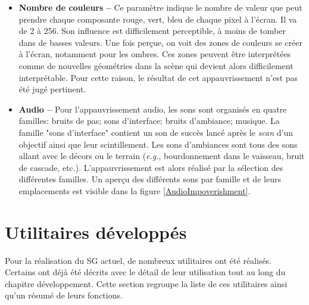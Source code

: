\begin{itemize}
			\item \textbf{Nombre de couleurs --} Ce paramètre indique le nombre de valeur que peut prendre chaque composante rouge, vert, bleu de chaque pixel à l'écran. Il va de 2 à 256. Son influence est difficilement perceptible, à moins de tomber dans de basses valeurs. Une fois perçue, on voit des zones de couleurs se créer à l'écran, notamment pour les ombres. Ces zones peuvent être interprétées comme de nouvelles géométries dans la scène qui devient alors difficilement interprétable. Pour cette raison, le résultat de cet appauvrissement n'est pas été jugé pertinent.
			
			\item \textbf{Audio --} Pour l'appauvrissement audio, les sons sont organisés en quatre familles: bruits de pas; sons d'interface; bruits d'ambiance; musique. La famille "sons d'interface" contient un son de succès lancé après le \textit{scan} d'un objectif ainsi que leur scintillement. Les sons d'ambiances sont tous des sons allant avec le décors ou le terrain (\textit{e.g.}, bourdonnement dans le vaisseau, bruit de cascade, etc.). L'appauvrissement est alors réalisé par la sélection des différentes familles. Un aperçu des différents sons par famille et de leurs emplacements est visible dans la figure \ref{AudioImpoverishment}.
		\end{itemize}
	
\section{Utilitaires développés}
	\label{sResUtilitaires}
	Pour la réalisation du SG actuel, de nombreux utilitaires ont été réalisés. Certains ont déjà été décrits avec le détail de leur utilisation tout au long du chapitre développement. Cette section regroupe la liste de ces utilitaires ainsi qu'un résumé de leurs fonctions.
	
